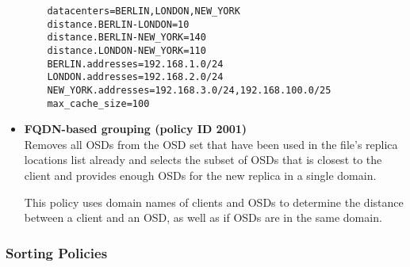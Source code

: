 \documentclass[a4paper,10pt]{book}
\begin{document}
\begin{itemize}
	\begin{verbatim}
	datacenters=BERLIN,LONDON,NEW_YORK
	distance.BERLIN-LONDON=10
	distance.BERLIN-NEW_YORK=140
	distance.LONDON-NEW_YORK=110
	BERLIN.addresses=192.168.1.0/24
	LONDON.addresses=192.168.2.0/24
	NEW_YORK.addresses=192.168.3.0/24,192.168.100.0/25
	max_cache_size=100
	\end{verbatim}

 \item \textbf{FQDN-based grouping (policy ID 2001)}\\
 Removes all OSDs from the OSD set that have been used in the file's replica locations list already and selects the subset of OSDs that is closest to the client and provides enough OSDs for the new replica in a single domain.

This policy uses domain names of clients and OSDs to determine the distance between a client and an OSD, as well as if OSDs are in the same domain.

\end{itemize}

\subsubsection{Sorting Policies}
\end{document}
